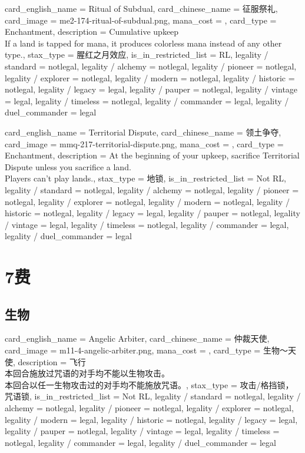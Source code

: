 \documentclass[lang = cn, color = black, 10pt]{AllThatStax}
\begin{document}
\card
{
	card_english_name = {Ritual of Subdual},
	card_chinese_name = {征服祭礼},
	card_image = me2-174-ritual-of-subdual.png,
	mana_cost = ,
	card_type = Enchantment,
	description = {Cumulative upkeep  \\
		If a land is tapped for mana, it produces colorless mana instead of any other type.},
	stax_type = 腥红之月效应,
	is_in_restricted_list = RL,
	legality / standard = notlegal,
	legality / alchemy = notlegal,
	legality / pioneer = notlegal,
	legality / explorer = notlegal,
	legality / modern = notlegal,
	legality / historic = notlegal,
	legality / legacy = legal,
	legality / pauper = notlegal,
	legality / vintage = legal,
	legality / timeless = notlegal,
	legality / commander = legal,
	legality / duel_commander = legal
}

\card
{
	card_english_name = {Territorial Dispute},
	card_chinese_name = {领土争夺},
	card_image = mmq-217-territorial-dispute.png,
	mana_cost = ,
	card_type = Enchantment,
	description = {At the beginning of your upkeep, sacrifice Territorial Dispute unless you sacrifice a land.\\
		Players can't play lands.},
	stax_type = 地锁,
	is_in_restricted_list = Not RL,
	legality / standard = notlegal,
	legality / alchemy = notlegal,
	legality / pioneer = notlegal,
	legality / explorer = notlegal,
	legality / modern = notlegal,
	legality / historic = notlegal,
	legality / legacy = legal,
	legality / pauper = notlegal,
	legality / vintage = legal,
	legality / timeless = notlegal,
	legality / commander = legal,
	legality / duel_commander = legal
}

\chapter{7费}

\section{生物}

\card
{
	card_english_name = {Angelic Arbiter},
	card_chinese_name = {仲裁天使},
	card_image = m11-4-angelic-arbiter.png,
	mana_cost = ,
	card_type = 生物～天使,
	description = {飞行\\
		本回合施放过咒语的对手均不能以生物攻击。\\
		本回合以任一生物攻击过的对手均不能施放咒语。},
	stax_type = 攻击/格挡锁，咒语锁,
	is_in_restricted_list = Not RL,
	legality / standard = notlegal,
	legality / alchemy = notlegal,
	legality / pioneer = notlegal,
	legality / explorer = notlegal,
	legality / modern = legal,
	legality / historic = notlegal,
	legality / legacy = legal,
	legality / pauper = notlegal,
	legality / vintage = legal,
	legality / timeless = notlegal,
	legality / commander = legal,
	legality / duel_commander = legal
}
\end{document}
